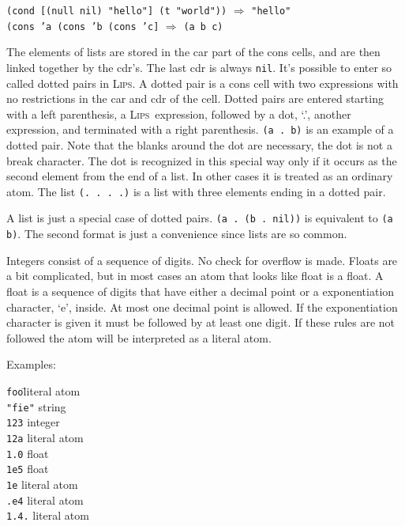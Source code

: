 \documentclass[a4paper]{article}
\newcommand{\lips}{\textsc{Lips}}
\newcommand{\lisp}[1]{\texttt{#1}}
\newcommand{\NIL}{\lisp{nil}}
\newenvironment{examples}{
  \newcommand{\ex}[2]{
    \lisp{##1} $\Rightarrow$ \lisp{##2}\\
  }
  \begin{adjustwidth}{0.5cm}{}}{\end{adjustwidth}}
\begin{document}
\begin{examples}
  \ex{(cond [(null nil) "hello"] (t "world"))}{"hello"}
  \ex{(cons 'a (cons 'b (cons 'c]}{(a b c)}
\end{examples}

The elements of lists are stored in the car part of the cons cells,
and are then linked together by the cdr's.  The last cdr is always
\NIL.  It's possible to enter so called dotted pairs in \lips.  A
dotted pair is a cons cell with two expressions with no restrictions
in the car and cdr of the cell.  Dotted pairs are entered starting
with a left parenthesis, a \lips\ expression, followed by a dot, `.',
another expression, and terminated with a right parenthesis.
\lisp{(a\ .\ b)} is an example of a dotted pair. Note that the blanks
around the dot are necessary, the dot is not a break character.  The
dot is recognized in this special way only if it occurs as the second
element from the end of a list.  In other cases it is treated as an
ordinary atom.  The list \lisp{(.\ .\ .\ .)} is a list with three
elements ending in a dotted pair.

A list is just a special case of dotted pairs.  \lisp{(a .\ (b
  .\ nil))} is equivalent to \lisp{(a b)}.  The second format is just
a convenience since lists are so common.

Integers consist of a sequence of digits.  No check for overflow is
made.  Floats are a bit complicated, but in most cases an atom that
looks like float is a float.  A float is a sequence of digits that
have either a decimal point or a exponentiation character, `e',
inside.  At most one decimal point is allowed.  If the exponentiation
character is given it must be followed by at least one digit.  If
these rules are not followed the atom will be interpreted as a literal
atom.

Examples:
\begin{tabbing}
\lisp{foo}\hspace*{1cm}\=literal atom\\
\lisp{"fie"}      \>string\\
\lisp{123}        \>integer\\
\lisp{12a}        \>literal atom\\
\lisp{1.0}        \>float\\
\lisp{1e5}        \>float\\
\lisp{1e}         \>literal atom\\
\lisp{.e4}        \>literal atom\\
\lisp{1.4.}       \>literal atom
\end{tabbing}
\end{document}
